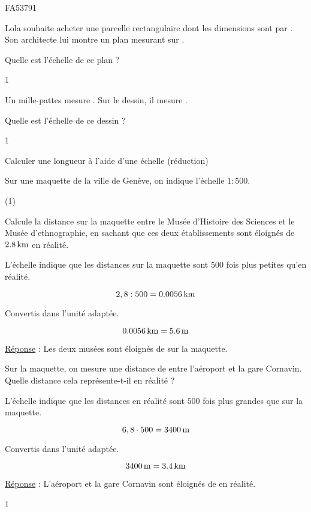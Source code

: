 \documentclass[a4paper,11pt]{report}
\begin{document}
\begin{exol}{FA53}{79}{1} %
\end{exol}

\begin{exo}{
    Lola souhaite acheter une parcelle rectangulaire dont les dimensions sont  par . Son architecte lui montre un plan mesurant  sur .

    Quelle est l'échelle de ce plan ?
}{1}    
\end{exo}

\begin{exo}{
    Un mille-pattes mesure . Sur le dessin, il mesure .

    Quelle est l'échelle de ce dessin ?
}{1}    
\end{exo}

\begin{resolu}{Calculer une longueur à l'aide d'une échelle (réduction)}{Sur une maquette de la ville de Genève, on indique l'échelle $1:500$.

\begin{tasks}(1)
    
\task Calcule la distance sur la maquette entre le Musée d'Histoire des Sciences et le Musée d'ethnographie, en sachant que ces deux établissements sont éloignés de $\tunit{2,8}{\kilo m}$ en réalité.

    L'échelle indique que les distances sur la maquette sont $500$ fois plus petites qu'en réalité. 
    
       \[2,8:500=\tunit{0,0056}{\kilo m}\]
        
    Convertis dans l'unité adaptée.

    \[\tunit{0,0056}{\kilo m}=\tunit{5,6}{m}\]

    \underline{Réponse} : Les deux musées sont éloignés de  sur la maquette.
    
\task Sur la maquette, on mesure une distance de  entre l'aéroport et la gare Cornavin. Quelle distance cela représente-t-il en réalité ?

    L'échelle indique que les distances en réalité sont $500$ fois plus grandes que sur la maquette. 
    
    \[6,8\cdot500=\tunit{3400}{m}\]
        
    Convertis dans l'unité adaptée.

    \[\tunit{3400}{m}=\tunit{3,4}{\kilo m}\]  

    \underline{Réponse} : L'aéroport et la gare Cornavin sont éloignés de  en réalité.
\end{tasks}
}{1}    
\end{resolu}
\end{document}
